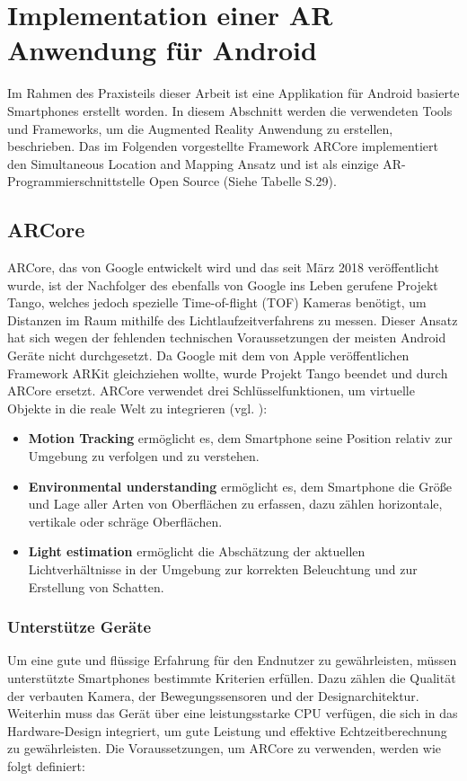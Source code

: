 \chapter{Implementation einer AR Anwendung für Android}
Im Rahmen des Praxisteils dieser Arbeit ist eine Applikation für Android basierte Smartphones erstellt worden. In diesem Abschnitt werden die verwendeten Tools und Frameworks, um die Augmented Reality Anwendung zu erstellen, beschrieben. Das im Folgenden vorgestellte Framework ARCore implementiert den Simultaneous Location and Mapping Ansatz und ist als einzige AR-Programmierschnittstelle Open Source (Siehe Tabelle S.29).



\section{ARCore}
ARCore, das von Google entwickelt wird und das seit März 2018 veröffentlicht wurde, ist der Nachfolger des ebenfalls von Google ins Leben gerufene Projekt Tango, welches jedoch spezielle \glqq Time-of-flight\grqq{} (TOF) Kameras benötigt, um Distanzen im Raum mithilfe des Lichtlaufzeitverfahrens zu messen. Dieser Ansatz hat sich wegen der fehlenden technischen Voraussetzungen der meisten Android Geräte nicht durchgesetzt. Da Google mit dem von Apple veröffentlichen Framework ARKit gleichziehen wollte, wurde Projekt Tango beendet und durch ARCore ersetzt. ARCore verwendet drei Schlüsselfunktionen, um virtuelle Objekte in die reale Welt zu integrieren (vgl. \cite{arcore}):

\begin{itemize}
\item \textbf{Motion Tracking} ermöglicht es, dem Smartphone seine Position relativ zur Umgebung zu verfolgen und zu verstehen.

\item \textbf{Environmental understanding} ermöglicht es, dem Smartphone die Größe und Lage aller Arten von Oberflächen  zu erfassen, dazu zählen horizontale, vertikale oder schräge Oberflächen.

\item \textbf{Light estimation} ermöglicht die Abschätzung der aktuellen Lichtverhältnisse in der Umgebung zur korrekten Beleuchtung und zur Erstellung von Schatten.
\end{itemize}

\subsection{Unterstütze Geräte}
Um eine gute und flüssige Erfahrung für den Endnutzer zu gewährleisten, müssen unterstützte Smartphones bestimmte Kriterien erfüllen. Dazu zählen die Qualität der verbauten Kamera, der Bewegungssensoren und der Designarchitektur. Weiterhin muss das Gerät über eine leistungsstarke CPU verfügen, die sich in das Hardware-Design integriert, um gute Leistung und effektive Echtzeitberechnung zu gewährleisten. Die Voraussetzungen, um ARCore zu verwenden, werden wie folgt definiert:

